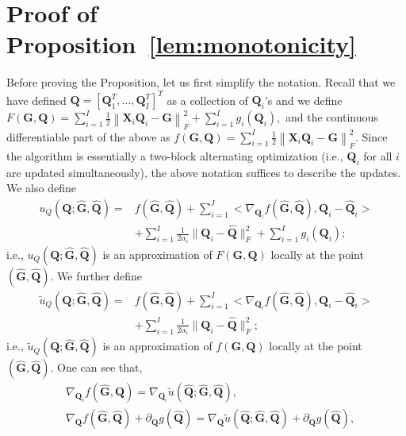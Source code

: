 \documentclass[10pt,journal]{IEEEtran}
\newcommand{\Q}{\boldsymbol{Q}}
\begin{document}
\section{Proof of Proposition~\ref{lem:monotonicity}}
Before proving the Proposition, let us first simplify the notation. Recall that we have defined ${\bm Q}=[{\bm Q}_1^T,\ldots,{\bm Q}_I^T]^T$ as a collection 
of $\Q_i$'s
and we define
$F({\bm G},{\bm Q}) = \sum_{i=1}^{I}\frac{1}{2}\left\|{\bm X}_i{\bm Q}_i-{\bm G}\right\|_F^2 + \sum_{i=1}^Ig_i(\Q_i),$
and the continuous differentiable part of the above as
$f({\bm G},{\bm Q}) = \sum_{i=1}^{I}\frac{1}{2}\left\|{\bm X}_i{\bm Q}_i-{\bm G}\right\|_F^2.$
Since the algorithm is essentially a two-block alternating optimization (i.e., ${\bm Q}_i$ for all $i$ are updated simultaneously), the above notation suffices to describe the updates.
We also define
\begin{align*}
u_Q\left(\Q;\hat{\bm G},\hat{\bm Q}\right) = &f(\hat{\bm G},\hat{\bm Q}) + \sum_{i=1}^I <\nabla_{{\bm Q}_i} f(\hat{\bm G},\hat{\bm Q}),{\bm Q}_i-\hat{\bm Q}_i>\\
&+ \sum_{i=1}^I\frac{1}{2\alpha_i}\|{\bm Q}_i-\hat{\bm Q}\|_F^2+ \sum_{i=1}^Ig_i(\Q_i);
\end{align*}
i.e., $u_Q\left({\bm Q};\hat{\bm G},\hat{\bm Q}\right)$ is an approximation of $F({\bm G},{\bm Q})$
locally at the point $(\hat{\bm G},\hat{\bm Q})$.
We further define
\begin{equation*}
\begin{aligned}
\tilde{u}_Q\left(\Q;\hat{\bm G},\hat{\bm Q}\right) = &f(\hat{\bm G},\hat{\bm Q})
+ \sum_{i=1}^I <\nabla_{{\bm Q}_i} f(\hat{\bm G},\hat{\bm Q}),{\bm Q}_i-\hat{\bm Q}_i>\\& + \sum_{i=1}^I\frac{1}{2\alpha_i}\|{\bm Q}_i-\hat{\bm Q}\|_F^2;
\end{aligned}
\end{equation*}
i.e., $\tilde{u}_Q\left(\Q;\hat{\bm G},\hat{\bm Q}\right)$ is an approximation of $f({\bm G},{\bm Q})$
locally at the point $(\hat{\bm G},\hat{\bm Q})$.
One can see that,
\begin{subequations}\label{eq:gradequal}
\begin{align}
	&\nabla_{{\bm Q}_i} f\left(\hat{\bm G},\hat{\bm Q}\right)=\nabla_{{\bm Q}_i} \tilde{u}\left(\hat{\bm Q};\hat{\bm G},\hat{\bm Q}\right),\\
	& \nabla_{{\bm Q}} f\left(\hat{\bm G},\hat{\bm Q}\right) + \partial_{\Q} g(\hat{\Q}) = \nabla_{{\bm Q}}\tilde{u}\left(\hat{\bm Q};\hat{\bm G},\hat{\bm Q}\right) + \partial_{\Q} g(\hat{\Q}),
\end{align}
\end{subequations}
\end{document}
